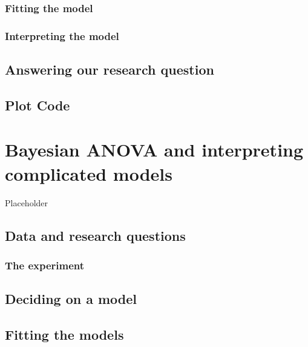 \documentclass[
]{book}
\begin{document}
\hypertarget{fitting-the-model-8}{%
\subsection{Fitting the model}\label{fitting-the-model-8}}

\hypertarget{interpreting-the-model-6}{%
\subsection{Interpreting the model}\label{interpreting-the-model-6}}

\hypertarget{answering-our-research-question}{%
\section{Answering our research question}\label{answering-our-research-question}}

\hypertarget{plot-code-6}{%
\section{Plot Code}\label{plot-code-6}}

\hypertarget{bayesian-anova-and-interpreting-complicated-models}{%
\chapter{Bayesian ANOVA and interpreting complicated models}\label{bayesian-anova-and-interpreting-complicated-models}}

Placeholder

\hypertarget{data-and-research-questions-7}{%
\section{Data and research questions}\label{data-and-research-questions-7}}

\hypertarget{the-experiment}{%
\subsection{The experiment}\label{the-experiment}}

\hypertarget{deciding-on-a-model}{%
\section{Deciding on a model}\label{deciding-on-a-model}}

\hypertarget{fitting-the-models}{%
\section{Fitting the models}\label{fitting-the-models}}
\end{document}
